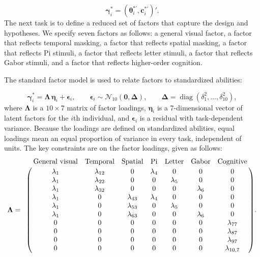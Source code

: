 \documentclass[
  ,man]{apa6}
\begin{document}
\[\boldsymbol{\gamma}^*_i = \left(\boldsymbol{\theta}^{*\prime}_i,\boldsymbol{c}^{*\prime}_i\right)'.\]
The next task is to define a reduced set of factors that capture the design and hypotheses. We specify seven factors as follows: a general visual factor, a factor that reflects temporal masking, a factor that reflects spatial masking, a factor that reflects Pi stimuli, a factor that reflects letter stimuli, a factor that reflects Gabor stimuli, and a factor that reflects higher-order cognition.

The standard factor model is used to relate factors to standardized abilities:

\[\boldsymbol{\gamma}^*_i = \boldsymbol{\Lambda}\,\boldsymbol{\eta}_i + \boldsymbol{\epsilon}_i, \qquad \boldsymbol{\epsilon}_i \sim \mathcal{N}_{10}\!\left(\mathbf{0}, \boldsymbol{\Delta}\right), \qquad \boldsymbol{\Delta} = \operatorname{diag}\!\left(\delta_1^2, \ldots, \delta_{10}^2\right),\]
where \(\boldsymbol{\Lambda}\) is a \(10 \times 7\) matrix of factor loadings, \(\boldsymbol{\eta}_i\) is a 7-dimensional vector of latent factors for the \(i\)th individual, and \(\boldsymbol{\epsilon}_i\) is a residual with task-dependent variance. Because the loadings are defined on standardized abilities, equal loadings mean an equal proportion of variance in every task, independent of units. The key constraints are on the factor loadings, given as follows:
\[
\boldsymbol{\Lambda} =
\bordermatrix{
 & \text{General visual} & \text{Temporal} & \text{Spatial} & \text{Pi} & \text{Letter} & \text{Gabor} & \text{Cognitive} \cr
 & \lambda_{1} & \lambda_{12} & 0 & \lambda_{4} & 0 & 0 & 0 \cr
 & \lambda_{1} & \lambda_{22} & 0 & 0 & \lambda_{5} & 0 & 0 \cr
 & \lambda_{1} & \lambda_{32} & 0 & 0 & 0 & \lambda_{6} & 0 \cr
 & \lambda_{1} & 0 & \lambda_{43} & \lambda_{4} & 0 & 0 & 0 \cr
 & \lambda_{1} & 0 & \lambda_{53} & 0 & \lambda_{5} & 0 & 0 \cr
 & \lambda_{1} & 0 & \lambda_{63} & 0 & 0 & \lambda_{6} & 0 \cr
 & 0 & 0 & 0 & 0 & 0 & 0 & \lambda_{77} \cr
 & 0 & 0 & 0 & 0 & 0 & 0 & \lambda_{87} \cr
 & 0 & 0 & 0 & 0 & 0 & 0 & \lambda_{97} \cr
 & 0 & 0 & 0 & 0 & 0 & 0 & \lambda_{10,7}
}.\]
\end{document}
